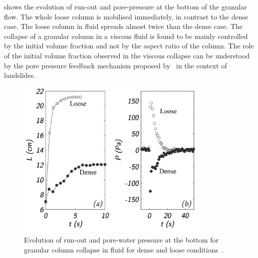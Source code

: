  shows the evolution of run-out 
and pore-pressure at the bottom of the granular flow. The whole loose column is 
mobilised immediately, in contrast to the dense case. The loose column in fluid 
spreads almost twice than the dense case. The collapse of a granular column in 
a viscous fluid is found to be mainly controlled by the initial volume fraction 
and not by the aspect ratio of the column. The role of the initial volume 
fraction observed in the viscous collapse can be understood by the pore 
pressure feedback mechanism proposed by~\citep{Schaeffer2008,Iverson2000} in 
the context of landslides. 

\begin{figure}[htbp]
\centering
\includegraphics[width=0.85\textwidth]{Runout_PWP_Fluid_Exp}
\caption{Evolution of run-out and pore-water pressure at the bottom for 
granular column collapse in fluid for dense and loose 
conditions~\citep{Rondon2011}.}
\label{fig:Runout_PWP_Fluid_Exp}
\end{figure}

